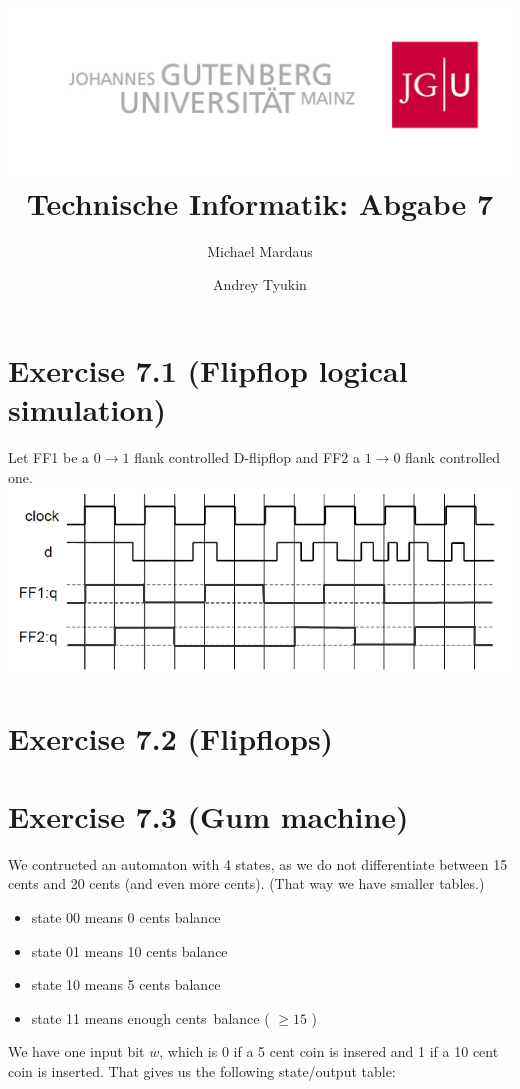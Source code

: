 \documentclass[10pt,a4paper]{scrartcl}
\author{Michael Mardaus \and Andrey Tyukin}
\title{\includegraphics[scale=0.2]{../logo_schriftzug}\\
Technische Informatik: Abgabe 7}
\begin{document}
\maketitle

\section*{Exercise 7.1 (Flipflop logical simulation)}
Let FF1 be a $0\rightarrow 1$ flank controlled D-flipflop and FF2 a $1\rightarrow0$ flank controlled one.\\
\includegraphics[width=\textwidth]{images/flipflop-sim.png} 

\FloatBarrier
\section*{Exercise 7.2 (Flipflops)}


\FloatBarrier
\section*{Exercise 7.3 (Gum machine)}

We contructed an automaton with 4 states, as we do not differentiate between 15 cents and 20 cents (and even more cents). (That way we have smaller tables.) 
\begin{itemize}
\item state 00 means 0 cents balance
\item state 01 means 10 cents balance
\item state 10 means 5 cents balance
\item state 11 means \glqq enough cents\grqq \ balance ( $\geq 15$ )
\end{itemize}

We have one input bit $w$, which is 0 if a 5 cent coin is insered and 1 if a 10 cent coin is inserted. That gives us the following state/output table:
\end{document}
